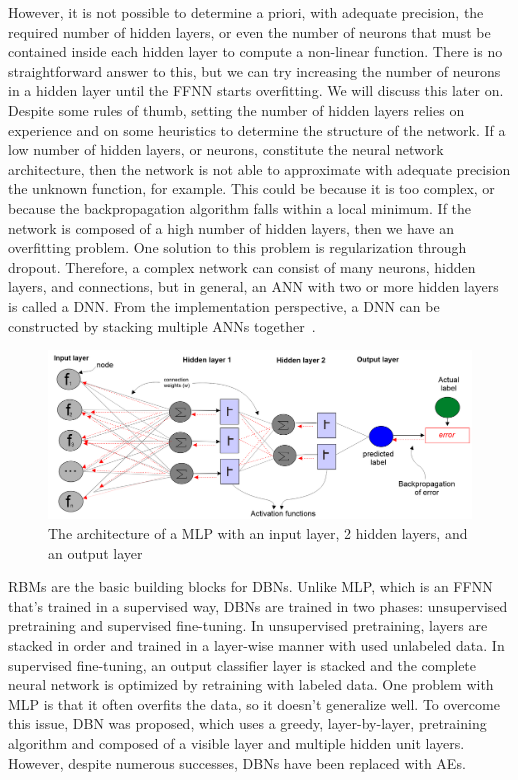 \hspace*{3.5mm} However, it is not possible to determine a priori, with adequate precision, the required number of hidden layers, or even the number of neurons that must be contained inside each hidden layer to compute a non-linear function. There is no straightforward answer to this, but we can try increasing the number of neurons in a hidden layer until the FFNN starts overfitting. We will discuss this later on. Despite some rules of thumb, setting the number of hidden layers relies on experience and on some heuristics to determine the structure of the network. If a low number of hidden layers, or neurons, constitute the neural network architecture, then the network is not able to approximate with adequate precision the unknown function, for example. This could be because it is too complex, or because the backpropagation algorithm falls within a local minimum. If the network is composed of a high number of hidden layers, then we have an overfitting problem. One solution to this problem is regularization through dropout. Therefore, a complex network can consist of many neurons, hidden layers, and connections, but in general, an ANN with two or more hidden layers is called a DNN. From the implementation perspective, a DNN can be constructed by stacking multiple ANNs together~\cite{karimDLTF2018}.

\begin{figure}[h]
    \centering
    \includegraphics[scale=0.7]{images/ffnn_1.png}
    \caption{The architecture of a MLP with an input layer, 2 hidden layers, and an output layer}
    \label{fig:mlp_1}
\end{figure}

\hspace*{3.5mm} RBMs are the basic building blocks for DBNs. Unlike MLP, which is an FFNN that's trained in a supervised way, DBNs are trained in two phases: unsupervised pretraining and supervised fine-tuning. In unsupervised pretraining, layers are stacked in order and trained in a layer-wise manner with used unlabeled data. In supervised fine-tuning, an output classifier layer is stacked and the complete neural network is optimized by retraining with labeled data. One problem with MLP is that it often overfits the data, so it doesn't generalize well. To overcome this issue, DBN was proposed, which uses a greedy, layer-by-layer, pretraining algorithm and composed of a visible layer and multiple hidden unit layers. However, despite numerous successes, DBNs have been replaced with AEs. 

